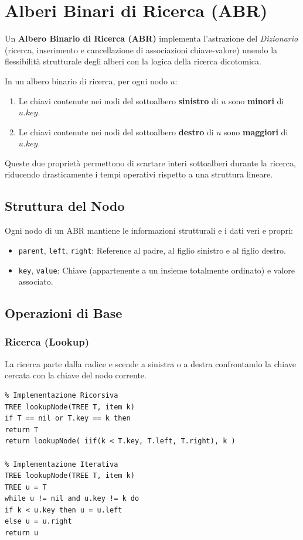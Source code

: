 \documentclass[12pt, a4paper]{article}
\begin{document}
\section{Alberi Binari di Ricerca (ABR)}

Un \textbf{Albero Binario di Ricerca (ABR)} implementa l'astrazione del \textit{Dizionario} (ricerca, inserimento e cancellazione di associazioni chiave-valore) unendo la flessibilità strutturale degli alberi con la logica della ricerca dicotomica.

\begin{tcolorbox}[colback=lightergray!10, colframe=tocsec, title=\textbf{Proprietà Fondamentale degli ABR}]
In un albero binario di ricerca, per ogni nodo $u$:
\begin{enumerate}
\item Le chiavi contenute nei nodi del sottoalbero \textbf{sinistro} di $u$ sono \textbf{minori} di $u.key$.
\item Le chiavi contenute nei nodi del sottoalbero \textbf{destro} di $u$ sono \textbf{maggiori} di $u.key$.
\end{enumerate}
Queste due proprietà permettono di scartare interi sottoalberi durante la ricerca, riducendo drasticamente i tempi operativi rispetto a una struttura lineare.
\end{tcolorbox}

\subsection{Struttura del Nodo}
Ogni nodo di un ABR mantiene le informazioni strutturali e i dati veri e propri:
\begin{itemize}
\item \texttt{parent}, \texttt{left}, \texttt{right}: Reference al padre, al figlio sinistro e al figlio destro.
\item \texttt{key}, \texttt{value}: Chiave (appartenente a un insieme totalmente ordinato) e valore associato.
\end{itemize}

\subsection{Operazioni di Base}

\subsubsection{Ricerca (Lookup)}
La ricerca parte dalla radice e scende a sinistra o a destra confrontando la chiave cercata con la chiave del nodo corrente.
\begin{verbatim}
% Implementazione Ricorsiva
TREE lookupNode(TREE T, item k)
if T == nil or T.key == k then
return T
return lookupNode( iif(k < T.key, T.left, T.right), k )

% Implementazione Iterativa
TREE lookupNode(TREE T, item k)
TREE u = T
while u != nil and u.key != k do
if k < u.key then u = u.left
else u = u.right
return u
\end{verbatim}
\end{document}
